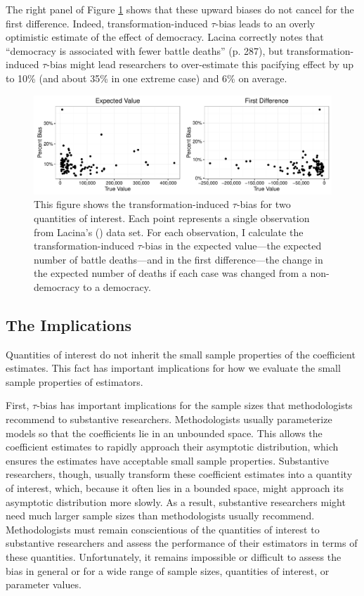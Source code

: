 \documentclass[12pt]{article}
\begin{document}
The right panel of Figure \ref{fig:lacina} shows that these upward biases do not cancel for the first difference. 
Indeed, transformation-induced $\tau$-bias leads to an overly optimistic estimate of the effect of democracy. 
Lacina correctly notes that ``democracy is associated with fewer battle deaths'' (p. 287), but transformation-induced $\tau$-bias might lead researchers to over-estimate this pacifying effect by up to 10\% (and about 35\% in one extreme case) and 6\% on average.

\begin{figure}[h!]
\begin{center}
\includegraphics[scale = .7]{figs/lacina.pdf}
\caption{This figure shows the transformation-induced $\tau$-bias for two quantities of interest. Each point represents a single observation from Lacina's (\citeyear{Lacina2006}) data set. For each observation, I calculate the transformation-induced $\tau$-bias in the expected value---the expected number of battle deaths---and in the first difference---the change in the expected number of deaths if each case was changed from a non-democracy to a democracy.}\label{fig:lacina}
\end{center}
\end{figure}

\subsection*{The Implications}

Quantities of interest do not inherit the small sample properties of the coefficient estimates. 
This fact has important implications for how we evaluate the small sample properties of estimators. 

First, $\tau$-bias has important implications for the sample sizes that methodologists recommend to substantive researchers. 
Methodologists usually parameterize models so that the coefficients lie in an unbounded space. 
This allows the coefficient estimates to rapidly approach their asymptotic distribution, which ensures the estimates have acceptable small sample properties. 
Substantive researchers, though, usually transform these coefficient estimates into a quantity of interest, which, because it often lies in a bounded space, might approach its asymptotic distribution more slowly. 
As a result, substantive researchers might need much larger sample sizes than methodologists usually recommend. 
Methodologists must remain conscientious of the quantities of interest to substantive researchers and assess the performance of their estimators in terms of these quantities.
Unfortunately, it remains impossible or difficult to assess the bias in general or for a wide range of sample sizes, quantities of interest, or parameter values.
\end{document}
